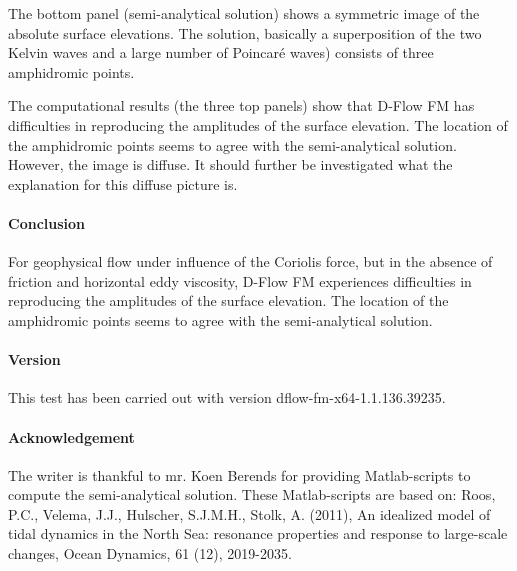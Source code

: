 The bottom panel (semi-analytical solution) shows a symmetric image of the absolute surface elevations. The solution, basically a superposition of the two Kelvin waves and a large number of Poincar\'e waves) consists of three amphidromic points.

The computational results (the three top panels) show that D-Flow FM has difficulties in reproducing the amplitudes of the surface elevation. The location of the amphidromic points seems to agree with the semi-analytical solution. However, the image is diffuse. It should further be investigated what the explanation for this diffuse picture is.




\paragraph*{Conclusion}
For geophysical flow under influence of the Coriolis force, but in the absence of friction and horizontal eddy viscosity, D-Flow FM experiences difficulties in reproducing the amplitudes of the surface elevation. The location of the amphidromic points seems to agree with the semi-analytical solution.



\paragraph*{Version}
This test has been carried out with version dflow-fm-x64-1.1.136.39235.


\paragraph*{Acknowledgement}
The writer is thankful to mr. Koen Berends for providing Matlab-scripts to compute the semi-analytical solution. These Matlab-scripts are based on: Roos, P.C., Velema, J.J., Hulscher, S.J.M.H., Stolk, A. (2011), An idealized model of tidal dynamics in the North Sea: resonance properties and response to large-scale changes, Ocean Dynamics, 61 (12), 2019-2035.
